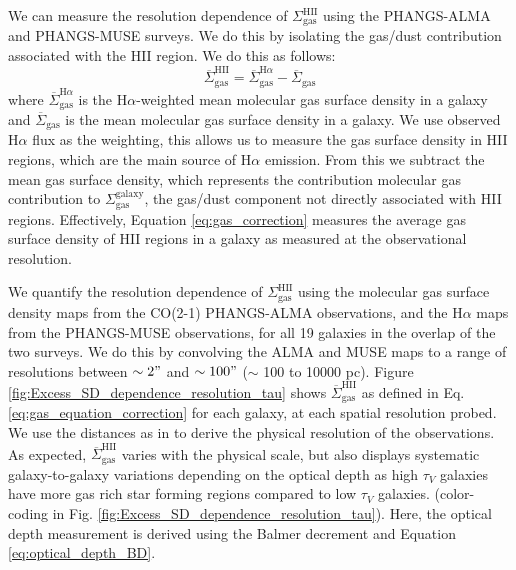 \documentclass[fleqn,usenatbib]{mnras}
\begin{document}
We can measure the resolution dependence of $\Sigma_{\textrm{gas}}^{\textrm{HII}}$ using the PHANGS-ALMA and PHANGS-MUSE surveys. We do this by isolating the gas/dust contribution associated with the HII region. We do this as follows: 
\begin{equation}
    \overline{\Sigma}_{\textrm{gas}}^{\textrm{HII}} = \overline{\Sigma}_{\textrm{gas}}^{\textrm{H}\alpha} - \overline{\Sigma}_{\textrm{gas}} 
    \label{eq:gas_correction}
\end{equation}
where $\overline{\Sigma}_{\textrm{gas}}^{\textrm{H}\alpha}$ is the H$\alpha$-weighted mean molecular gas surface density in a galaxy and $\overline{\Sigma}_{\textrm{gas}}$ is the mean molecular gas surface density in a galaxy. We use observed H$\alpha$ flux as the weighting, this allows us to measure the gas surface density in HII regions, which are the main source of H$\alpha$ emission. From this we subtract the mean gas surface density, which represents the contribution molecular gas contribution to $\Sigma_{\textrm{gas}}^{\textrm{galaxy}}$, the gas/dust component not directly associated with HII regions.
Effectively, Equation \ref{eq:gas_correction} measures the average gas surface density of HII regions in a galaxy as measured at the observational resolution.

We quantify the resolution dependence of $\Sigma_{\textrm{gas}}^{\textrm{HII}}$ using the molecular gas surface density maps from the CO(2-1) PHANGS-ALMA observations,  and the H$\alpha$ maps from the PHANGS-MUSE observations, for all 19 galaxies in the overlap of the two surveys. We do this by convolving the ALMA and MUSE maps to a range of resolutions between $\sim2"$ and $\sim100"$ ($\sim$ 100 to 10000 pc). Figure \ref{fig:Excess_SD_dependence_resolution_tau} shows $\overline{\Sigma}_{\textrm{gas}}^{\textrm{HII}}$ as defined in Eq. \ref{eq:gas_equation_correction} for each galaxy, at each spatial resolution probed. We use the distances as in \cite{leroy2021} to derive the physical resolution of the observations. As expected, $\overline{\Sigma}_{\textrm{gas}}^{\textrm{HII}}$ varies with the physical scale, but also displays systematic galaxy-to-galaxy variations depending on the optical depth as high $\tau_{V}$ galaxies have more gas rich star forming regions compared to low $\tau_{V}$ galaxies. (color-coding in Fig. \ref{fig:Excess_SD_dependence_resolution_tau}). Here, the optical depth measurement is derived using the Balmer decrement and Equation \ref{eq:optical_depth_BD}.
\end{document}
